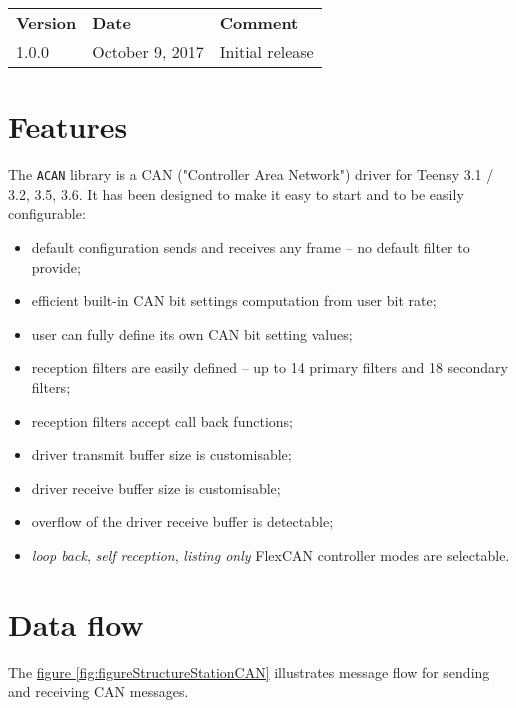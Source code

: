 \documentclass[9pt, a4paper, obeyspaces, openany]{extarticle}
\newcommand\refFigure[2]{\hyperref[fig:#2]{figure \ref*{fig:#2}{\ifthenelse{\equal{#1}{}}{}{.#1}}}}
\begin{document}
\begin{center}
  \begin{tabular}{lll}
    \textbf{Version} & \textbf{Date} & \textbf{Comment}\\
    1.0.0 & October 9, 2017 & Initial release \\
  \end{tabular}
\end{center}

\section{Features}

The \texttt{ACAN} library is a CAN ("Controller Area Network") driver for Teensy 3.1 / 3.2, 3.5, 3.6. It has been designed to make it easy to start and to be easily configurable:
\begin{itemize}
  \item default configuration sends and receives any frame -- no default filter to provide;
  \item efficient built-in CAN bit settings computation from user bit rate;
  \item user can fully define its own CAN bit setting values;
  \item reception filters are easily defined -- up to 14 primary filters and 18 secondary filters;
  \item reception filters accept call back functions;
  \item driver transmit buffer size is customisable;
  \item driver receive buffer size is customisable;
  \item overflow of the driver receive buffer is detectable;
  \item \emph{loop back}, \emph{self reception}, \emph{listing only} FlexCAN controller modes are selectable.
\end{itemize}



\section{Data flow}

The \refFigure{}{figureStructureStationCAN} illustrates message flow for sending and receiving CAN messages.
\end{document}
